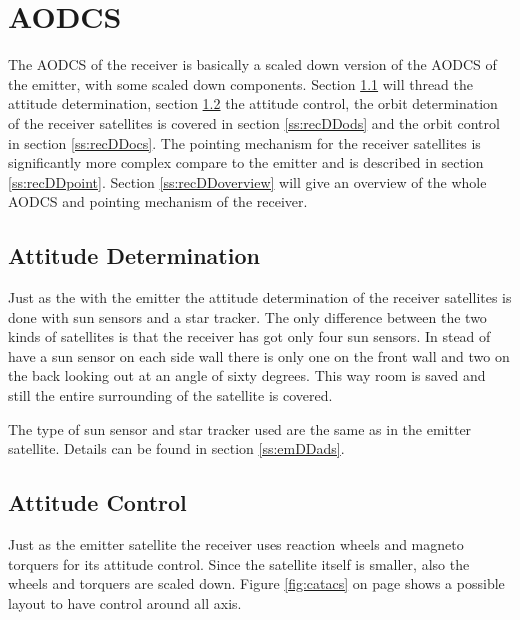 \section{\acl{AODCS}}
\label{recDDadcs}
The \ac{AODCS} of the receiver is basically a scaled down version of the \ac{AODCS} of the emitter, with some scaled down components. Section \ref{ss:recDDads} will thread the attitude determination, section \ref{ss:recDDacs} the attitude control, the orbit determination of the receiver satellites is covered in section \ref{ss:recDDods} and the orbit control in section \ref{ss:recDDocs}. The pointing mechanism for the receiver satellites is significantly more complex compare to the emitter and is described in section \ref{ss:recDDpoint}. Section \ref{ss:recDDoverview} will give an overview of the whole \ac{AODCS} and pointing mechanism of the receiver.
\subsection{Attitude Determination}
\label{ss:recDDads}
Just as the with the emitter the attitude determination of the receiver satellites is done with sun sensors and a star tracker. The only difference between the two kinds of satellites is that the receiver has got only four sun sensors. In stead of have a sun sensor on each side wall there is only one on the front wall and two on the back looking out at an angle of sixty degrees. This way room is saved and still the entire surrounding of the satellite is covered.

The type of sun sensor and star tracker used are the same as in the emitter satellite. Details can be found in section \ref{ss:emDDads}.

\subsection{Attitude Control}
\label{ss:recDDacs}
Just as the emitter satellite the receiver uses reaction wheels and magneto torquers for its attitude control. Since the satellite itself is smaller, also the wheels and torquers are scaled down. Figure \ref{fig:catacs} on page \pageref{fig:catacs} shows a possible layout to have control around all axis.

